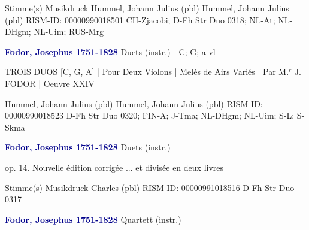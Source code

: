 \documentclass[twocolumn]{book}
\begin{document}
\newline \textcolor{darkblue}{}  Stimme(s)
\newline Musikdruck
\newline Hummel, Johann Julius  (pbl)
\newline Hummel, Johann Julius  (pbl)
\newline RISM-ID: 00000990018501
\newline CH-Zjacobi; D-Fh  Str Duo 0318; NL-At; NL-DHgm; NL-Uim; RUS-Mrg
\newline \par \vspace{7pt} \textcolor{darkblue}{\textbf{Fodor, Josephus  1751-1828}}
\newline Duets (instr.) - C; G; a
 vl
\newline \begin{itshape}TROIS DUOS [C, G, A] | Pour Deux Violons | Melés de Airs Variés | Par  M.$^r$ J. FODOR | Oeuvre XXIV\end{itshape} 
\newline Hummel, Johann Julius  (pbl)
\newline Hummel, Johann Julius  (pbl)
\newline RISM-ID: 00000990018523
\newline D-Fh  Str Duo 0320; FIN-A; J-Tma; NL-DHgm; NL-Uim; S-L; S-Skma
\newline \par \vspace{7pt} \textcolor{darkblue}{\textbf{Fodor, Josephus  1751-1828}}
\newline Duets (instr.)
\newline \begin{itshape}op. 14. Nouvelle édition corrigée ... et divisée en deux livres\end{itshape} 
\newline \textcolor{darkblue}{}  Stimme(s)
\newline Musikdruck
\newline Charles  (pbl)
\newline RISM-ID: 00000991018516
\newline D-Fh  Str Duo 0317
\newline \par \vspace{7pt} \textcolor{darkblue}{\textbf{Fodor, Josephus  1751-1828}}
\newline Quartett (instr.)
\end{document}

